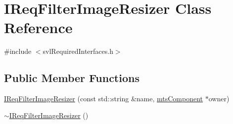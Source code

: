\hypertarget{class_i_req_filter_image_resizer}{}\section{I\+Req\+Filter\+Image\+Resizer Class Reference}
\label{class_i_req_filter_image_resizer}


{\ttfamily \#include $<$svl\+Required\+Interfaces.\+h$>$}

\subsection*{Public Member Functions}
\begin{DoxyCompactItemize}
\item 
\hyperlink{class_i_req_filter_image_resizer_ac431364f9a74a86ba92f433e116dbd8f}{I\+Req\+Filter\+Image\+Resizer} (const std\+::string \&name, \hyperlink{classmts_component}{mts\+Component} $\ast$owner)
\item 
\hyperlink{class_i_req_filter_image_resizer_a5af76402bd0fe8bc1b28a61942215222}{$\sim$\+I\+Req\+Filter\+Image\+Resizer} ()
\end{DoxyCompactItemize}
